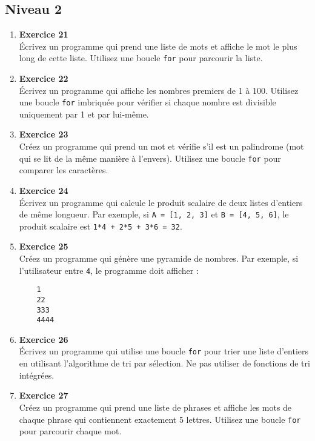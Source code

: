 \documentclass{article}
\begin{document}
\subsection{Niveau 2}

\begin{enumerate}

    \item \textbf{Exercice 21} \\
    Écrivez un programme qui prend une liste de mots et affiche le mot le plus long de cette liste. Utilisez une boucle \texttt{for} pour parcourir la liste.

    \item \textbf{Exercice 22} \\
    Écrivez un programme qui affiche les nombres premiers de 1 à 100. Utilisez une boucle \texttt{for} imbriquée pour vérifier si chaque nombre est divisible uniquement par 1 et par lui-même.

    \item \textbf{Exercice 23} \\
    Créez un programme qui prend un mot et vérifie s’il est un palindrome (mot qui se lit de la même manière à l’envers). Utilisez une boucle \texttt{for} pour comparer les caractères.

    \item \textbf{Exercice 24} \\
    Écrivez un programme qui calcule le produit scalaire de deux listes d'entiers de même longueur. Par exemple, si \texttt{A = [1, 2, 3]} et \texttt{B = [4, 5, 6]}, le produit scalaire est \texttt{1*4 + 2*5 + 3*6 = 32}.

    \item \textbf{Exercice 25} \\
    Créez un programme qui génère une pyramide de nombres. Par exemple, si l'utilisateur entre \texttt{4}, le programme doit afficher : \\
    \begin{verbatim}
    1
    22
    333
    4444
    \end{verbatim}

    \item \textbf{Exercice 26} \\
    Écrivez un programme qui utilise une boucle \texttt{for} pour trier une liste d’entiers en utilisant l'algorithme de tri par sélection. Ne pas utiliser de fonctions de tri intégrées.

    \item \textbf{Exercice 27} \\
    Créez un programme qui prend une liste de phrases et affiche les mots de chaque phrase qui contiennent exactement 5 lettres. Utilisez une boucle \texttt{for} pour parcourir chaque mot.


\end{enumerate}
\end{document}
